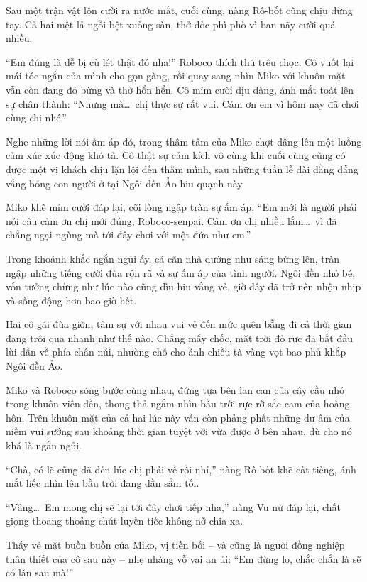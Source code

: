 \documentclass[../main.tex]{subfiles}
\begin{document}
Sau một trận vật lộn cười ra nước mắt, cuối cùng, nàng Rô-bốt cũng chịu dừng tay. Cả hai mệt lả ngồi bệt xuống sàn, thở dốc phì phò vì ban nãy cười quá nhiều.

``Em đúng là dễ bị cù lét thật đó nha!'' Roboco thích thú trêu chọc. Cô vuốt lại mái tóc ngắn của mình cho gọn gàng, rồi quay sang nhìn Miko với khuôn mặt vẫn còn đang đỏ bừng và thở hổn hển. Cô mỉm cười dịu dàng, ánh mắt toát lên sự chân thành: ``Nhưng mà\dots\ chị thực sự rất vui. Cảm ơn em vì hôm nay đã chơi cùng chị nhé.''

Nghe những lời nói ấm áp đó, trong thâm tâm của Miko chợt dâng lên một luồng cảm xúc xúc động khó tả. Cô thật sự cảm kích vô cùng khi cuối cùng cũng có được một vị khách chịu lặn lội đến thăm mình, sau những tuần lễ dài đằng đẵng vắng bóng con người ở tại Ngôi đền Ảo hiu quạnh này.

Miko khẽ mỉm cười đáp lại, cõi lòng ngập tràn sự ấm áp. ``Em mới là người phải nói câu cảm ơn chị mới đúng, Roboco-senpai. Cảm ơn chị nhiều lắm\dots\ vì đã chẳng ngại ngùng mà tới đây chơi với một đứa như em.''

Trong khoảnh khắc ngắn ngủi ấy, cả căn nhà dường như sáng bừng lên, tràn ngập những tiếng cười đùa rộn rã và sự ấm áp của tình người. Ngôi đền nhỏ bé, vốn tưởng chừng như lúc nào cũng đìu hiu vắng vẻ, giờ đây đã trở nên nhộn nhịp và sống động hơn bao giờ hết.

\ct

Hai cô gái đùa giỡn, tâm sự với nhau vui vẻ đến mức quên bẵng đi cả thời gian đang trôi qua nhanh như thế nào. Chẳng mấy chốc, mặt trời đỏ rực đã bắt đầu lùi dần về phía chân núi, nhường chỗ cho ánh chiều tà vàng vọt bao phủ khắp Ngôi đền Ảo.

Miko và Roboco sóng bước cùng nhau, đứng tựa bên lan can của cây cầu nhỏ trong khuôn viên đền, thong thả ngắm nhìn bầu trời rực rỡ sắc cam của hoàng hôn. Trên khuôn mặt của cả hai lúc này vẫn còn phảng phất những dư âm của niềm vui sướng sau khoảng thời gian tuyệt vời vừa được ở bên nhau, dù cho nó khá là ngắn ngủi.


``Chà, có lẽ cũng đã đến lúc chị phải về rồi nhỉ,'' nàng Rô-bốt khẽ cất tiếng, ánh mắt liếc nhìn lên bầu trời đang dần sẩm tối.

``Vâng\dots\ Em mong chị sẽ lại tới đây chơi tiếp nha,'' nàng Vu nữ đáp lại, chất giọng thoang thoảng chút luyến tiếc không nỡ chia xa.

Thấy vẻ mặt buồn buồn của Miko, vị tiền bối -- và cũng là người đồng nghiệp thân thiết của cô sau này -- nhẹ nhàng vỗ vai an ủi: ``Em đừng lo, chắc chắn là sẽ có lần sau mà!''
\end{document}
